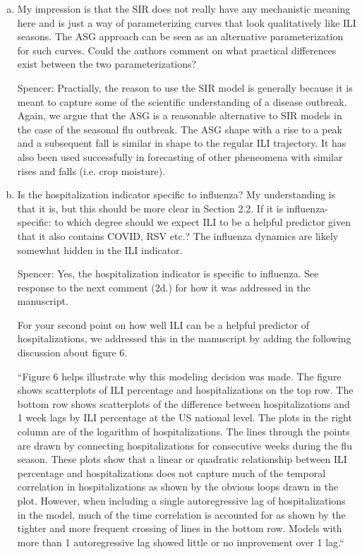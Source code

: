 \documentclass{article}
\newcommand{\spencer}[1]{{\color{blue} Spencer: #1}}
\begin{document}
\begin{enumerate}[1.]
\begin{enumerate}[a.]
{We cite Osthus et al. 2019, who also touch on this.}


\item My impression is that the SIR does not really have any mechanistic meaning here and is just a
way of parameterizing curves that look qualitatively like ILI seasons. The ASG approach can be
seen as an alternative parameterization for such curves. Could the authors comment on what
practical differences exist between the two parameterizations?

\spencer{Practially, the reason to use the SIR model is generally because it is meant
to capture some of the scientific understanding of a disease outbreak. Again, we argue 
that the ASG is a reasonable alternative to SIR models in the case of the seasonal flu
outbreak. The ASG shape with a rise to a peak and a subsequent fall is similar in shape
to the regular ILI trajectory. It has also been used successfully in forecasting of 
other pheneomena with similar rises and falls (i.e. crop moisture)}.



\item Is the hospitalization indicator specific to influenza? My understanding is that it is, but this
should be more clear in Section 2.2. If it is influenza-specific: to which degree should we expect ILI
to be a helpful predictor given that it also contains COVID, RSV etc.? The influenza dynamics are
likely somewhat hidden in the ILI indicator.

\spencer{Yes, the hospitalization indicator is specific to influenza. See 
response to the next comment (2d.) for how it was addressed in the manuscript. 

For your second point on how well ILI can be a helpful predictor of hospitalizations,
we addressed this in the manuscript by adding the following discussion about
figure 6.


``Figure 6 helps
illustrate why this modeling decision was made.
The figure shows scatterplots of ILI percentage and 
hospitalizations on the top row.
The bottom row shows scatterplots of the difference between hospitalizations and 
1 week lags
by ILI percentage at the US national level. The plots in the right column
are of the logarithm of hospitalizations. The lines through the points are
drawn by connecting hospitalizations for consecutive weeks during the flu 
season.
These plots show that a linear or quadratic relationship between ILI percentage 
and hospitalizations does not capture much of the temporal correlation in 
hospitalizations as shown by the obvious loops drawn in the plot. 
However, when including a 
single autoregressive lag of hospitalizations in the model, much of the time 
correlation is
accounted for as shown by the tighter and more frequent crossing of lines
in the bottom row. Models with more than 1 autoregressive
lag showed little or no 
improvement over 1 lag.``}





\end{enumerate}
\end{enumerate}
\end{document}
